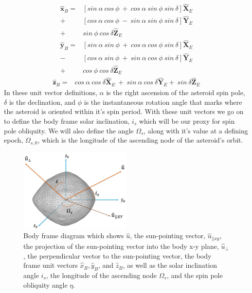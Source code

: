 \begin{equation}
    \begin{split}
    \mathbf{\hat{x}}_B = &[sin \: \alpha \: cos \: \phi \: + \: cos \: \alpha \: sin \: \phi \: sin \: \delta]\mathbf{\hat{X}}_E \\
    + &[cos \: \alpha \: cos \: \phi \: - \: sin \: \alpha \: sin \: \phi \: sin \: \delta]\mathbf{\hat{Y}}_E \\
    + &sin \: \phi \: cos \: \delta \mathbf{\hat{Z}}_E
    \end{split}
\end{equation}
\begin{equation}
    \begin{split}
    \mathbf{\hat{y}}_B = &[sin \: \alpha \: sin \: \phi \: + \: cos \: \alpha \: cos \: \phi \: sin \: \delta]\mathbf{\hat{X}}_E \\
    - &[cos \: \alpha \: sin \: \phi \: + \: sin \: \alpha \: cos \: \phi \: sin \: \delta]\mathbf{\hat{Y}}_E \\
    + &cos \: \phi \: cos \: \delta \mathbf{\hat{Z}}_E
    \end{split}
\end{equation}
\begin{equation}
    \begin{split}
    \mathbf{\hat{z}}_B = &cos \: \alpha \: cos\: \delta\mathbf{\hat{X}}_E \:+ \: sin \: \alpha \: cos \: \delta\mathbf{\hat{Y}}_E  + \: sin \: \delta \mathbf{\hat{Z}}_E
    \end{split}
\end{equation}
In these unit vector definitions, $\alpha$ is the right ascension of the asteroid spin pole, $\delta$ is the declination, and $\phi$ is the instantaneous rotation angle that marks where the asteroid is oriented within it's spin period. With these unit vectors we go on to define the body frame solar inclination, $i_s$ which will be our proxy for spin pole obliquity. We will also define the angle $\Omega_s$, along with it's value at a defining epoch, $\Omega_{s,0}$, which is the longitude of the ascending node of the asteroid's orbit.
\begin{figure}[H]
    \centering
    \includegraphics[width=0.5\textwidth]{fig/body_frame_w_obliq.jpg}
    \caption{Body frame diagram which shows $\hat{u}$, the sun-pointing vector, $\hat{u}_{||xy}$, the projection of the sun-pointing vector into the body x-y plane, $\hat{u}_{\perp}$, the perpendicular vector to the sun-pointing vector, the body frame unit vectors $\hat{x}_B, \hat{y}_B$, and $\hat{z}_B$, as well as the solar inclination angle $i_s$, the longitude of the ascending node $\Omega_s$, and the spin pole obliquity angle $\eta$. }
    \label{body_frame}
\end{figure}

